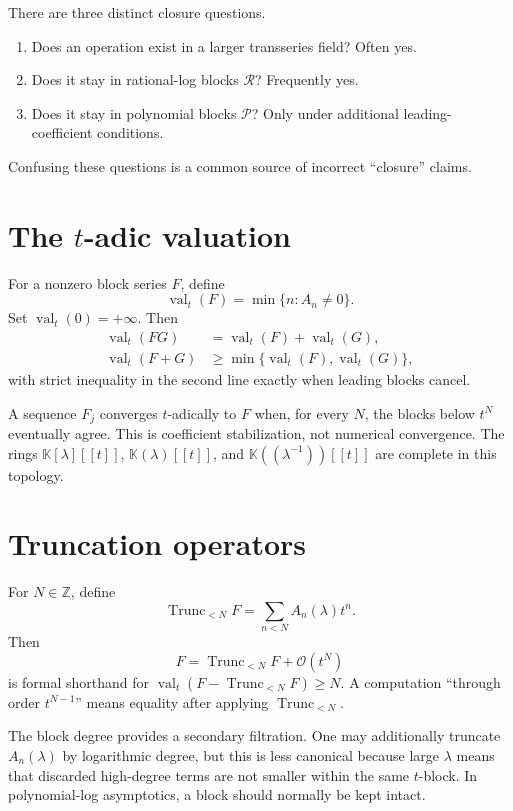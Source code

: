 \documentclass[11pt,openany]{book}
\theoremstyle{definition}
\theoremstyle{plain}
\theoremstyle{remark}
\newcommand{\Z}{\mathbb{Z}}
\newcommand{\K}{\mathbb{K}}
\newcommand{\Plog}{\mathscr{P}}
\newcommand{\Rlog}{\mathscr{R}}
\newcommand{\bigO}{\mathcal{O}}
\DeclareMathOperator{\val}{val}
\DeclareMathOperator{\trunc}{Trunc}
\begin{document}
\begin{checkpointbox}
There are three distinct closure questions.
\begin{enumerate}
\item Does an operation exist in a larger transseries field? Often yes.
\item Does it stay in rational-log blocks \(\Rlog\)? Frequently yes.
\item Does it stay in polynomial blocks \(\Plog\)? Only under additional leading-coefficient conditions.
\end{enumerate}
Confusing these questions is a common source of incorrect ``closure'' claims.
\end{checkpointbox}

\section{The \texorpdfstring{\(t\)}{t}-adic valuation}
For a nonzero block series \(F\), define
\begin{equation}\label{eq:t-valuation}
 \val_t(F)=\min\{n:A_n\ne0\}.
\end{equation}
Set \(\val_t(0)=+\infty\). Then
\begin{align*}
 \val_t(FG)&=\val_t(F)+\val_t(G),\\
 \val_t(F+G)&\ge\min\{\val_t(F),\val_t(G)\},
\end{align*}
with strict inequality in the second line exactly when leading blocks cancel.

A sequence \(F_j\) converges \(t\)-adically to \(F\) when, for every \(N\), the blocks below \(t^N\) eventually agree. This is coefficient stabilization, not numerical convergence. The rings \(\K[\lambda][[t]]\), \(\K(\lambda)[[t]]\), and \(\K((\lambda^{-1}))[[t]]\) are complete in this topology.

\section{Truncation operators}
For \(N\in\Z\), define
\begin{equation}\label{eq:trunc}
 \trunc_{<N}F=\sum_{n<N}A_n(\lambda)t^n.
\end{equation}
Then
\[
 F=\trunc_{<N}F+\bigO(t^N)
\]
is formal shorthand for \(\val_t(F-\trunc_{<N}F)\ge N\). A computation ``through order \(t^{N-1}\)'' means equality after applying \(\trunc_{<N}\).

The block degree provides a secondary filtration. One may additionally truncate \(A_n(\lambda)\) by logarithmic degree, but this is less canonical because large \(\lambda\) means that discarded high-degree terms are not smaller within the same \(t\)-block. In polynomial-log asymptotics, a block should normally be kept intact.
\end{document}
